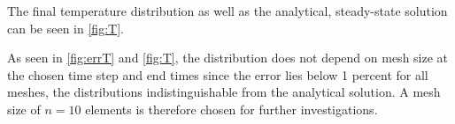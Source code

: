 The final temperature distribution as well as the analytical, steady-state solution can be seen in \autoref{fig:T}.

As seen in \autoref{fig:errT} and \ref{fig:T}, the distribution does not depend on mesh size at the chosen time step and end times since the error lies below 1 percent for all meshes, the distributions indistinguishable from the analytical solution. A mesh size of $n = 10$ elements is therefore chosen for further investigations.









